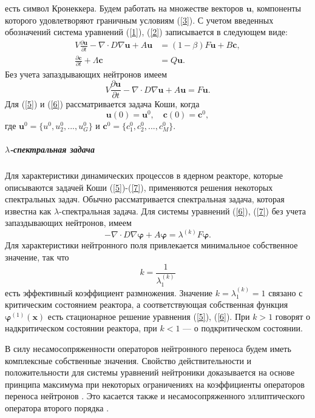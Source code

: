 \documentclass{crm-article}
\begin{document}
есть символ Кронеккера.
Будем работать на множестве векторов $\bm u$, компоненты которого удовлетворяют граничным условиям (\ref{3}).
С учетом введенных обозначений система уравнений (\ref{1}), (\ref{2}) записывается в следующем виде:
\begin{equation}\label{5}
\begin{split}
V \frac{\partial\bm{u}}{\partial t} -\nabla \cdot D \nabla \bm u  + A \bm{u} &=(1-\beta) F \bm{u} + B\bm c,
\\
\frac{\partial\bm c}{\partial t} + \Lambda \bm c &= Q \bm{u}. 
\end{split}
\end{equation}
Без учета запаздывающих нейтронов имеем
\begin{equation}\label{6}
V \frac{\partial\bm{u}}{\partial t} -\nabla \cdot D \nabla \bm{u}  + A \bm{u} = F \bm{u}.
\end{equation}  
Для (\ref{5}) и (\ref{6}) рассматривается задача Коши, когда
\begin{equation}\label{7}
 \bm u(0) = \bm u^0, \quad \bm c(0) = \bm c^0,
\end{equation} 
где $\bm u^0 = \{u^0,  u_2^0, ...,  u_G^0 \}$ и 
$\bm c^0 = \{ c_1^0,  c_2^0, ...,  c_M^0 \}$.

\subparagraph{$\lambda$-спектральная задача}
Для характеристики динамических процессов в ядерном реакторе, которые описываются задачей Коши (\ref{5})-(\ref{7}), применяются решения некоторых спектральных задач.
Обычно рассматривается спектральная задача, которая известна как $\lambda$-спектральная задача.
Для системы уравнений (\ref{6}), (\ref{7}) без учета запаздывающих нейтронов, имеем
\begin{equation}\label{8}
-\nabla \cdot D \nabla \bm \varphi + A  \bm \varphi  = \lambda^{(k)} F \bm \varphi.
\end{equation}
Для характеристики нейтронного поля привлекается минимальное собственное значение, так что
\[
 k = \frac{1}{\lambda^{(k)}_1}  
\] 
есть эффективный коэффициент размножения.
Значение $k = \lambda^{(k)}_1 = 1$ связано с критическим состоянием реактора, а соответствующая собственная функция $\bm{\varphi}^{(1)}(\bm x)$ есть стационарное решение уравнения (\ref{5}), (\ref{6}).
При $k > 1$  говорят о надкритическом состоянии реактора, при $k < 1$  --- о подкритическом состоянии.

В силу несамосопряженности операторов нейтронного переноса будем иметь комплексные собственные значения.
Свойство действительности и положительности для системы уравнений нейтроники доказывается на основе принципа максимума при некоторых ограничениях на коэффициенты операторов переноса нейтронов \cite{habetler1961}.
Это касается также и несамосопряженного эллиптического оператора второго порядка \cite{evans1990}.
\end{document}

